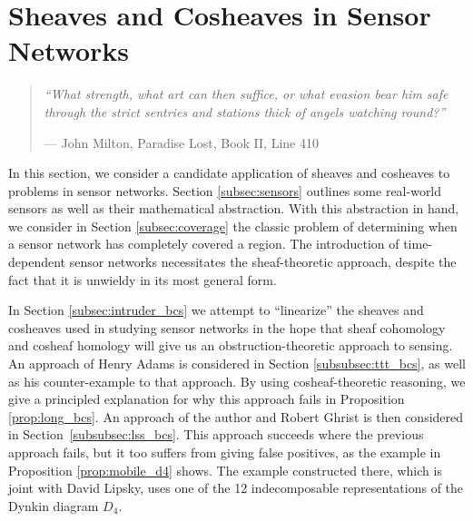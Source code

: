 
%
%

\chapter{Sheaves and Cosheaves in Sensor Networks}
\label{sec:sensors}

\begin{quote}
{\em``What strength, what art can then suffice, or what evasion bear him safe through the strict sentries and stations thick of angels watching round?''}
\begin{flushright} --- John Milton, Paradise Lost, Book II, Line 410~\cite{milton2008paradise} \end{flushright}
\end{quote}

In this section, we consider a candidate application of sheaves and cosheaves to problems in sensor networks. Section \ref{subsec:sensors} outlines some real-world  sensors as well as their mathematical abstraction. With this abstraction in hand, we consider in Section \ref{subsec:coverage} the classic problem of determining when a sensor network has completely covered a region. The introduction of time-dependent sensor networks necessitates the sheaf-theoretic approach, despite the fact that it is unwieldy in its most general form.

In Section \ref{subsec:intruder_bcs} we attempt to ``linearize'' the sheaves and cosheaves used in studying sensor networks in the hope that sheaf cohomology and cosheaf homology will give us an obstruction-theoretic approach to sensing. An approach of Henry Adams is considered in Section \ref{subsubsec:ttt_bcs}, as well as his counter-example to that approach. By using cosheaf-theoretic reasoning, we give a principled explanation for why this approach fails in Proposition \ref{prop:long_bcs}. An approach of the author and Robert Ghrist is then considered in Section~\ref{subsubsec:lss_bcs}. This approach succeeds where the previous approach fails, but it too suffers from giving false positives, as the example in Proposition \ref{prop:mobile_d4} shows. The example constructed there, which is joint with David Lipsky, uses one of the 12 indecomposable representations of the Dynkin diagram $D_4$.

